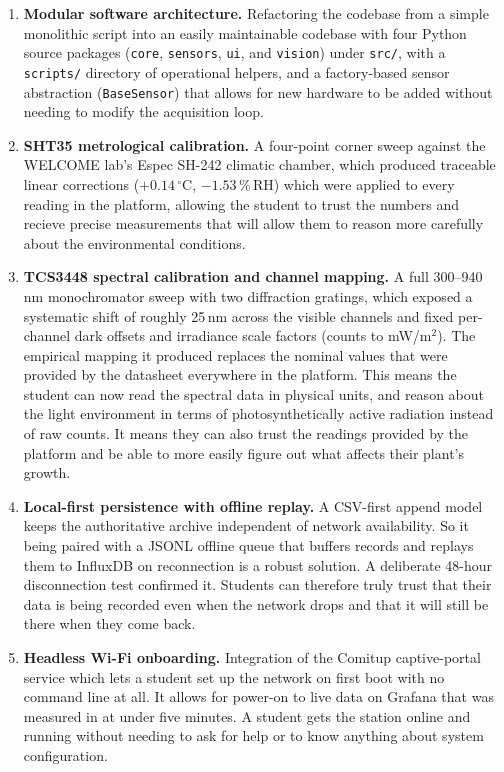 \begin{enumerate}
    \item \textbf{Modular software architecture.} Refactoring the codebase from a simple monolithic script into an easily maintainable codebase with four Python source packages (\texttt{core}, \texttt{sensors}, \texttt{ui}, and \texttt{vision}) under \texttt{src/}, with a \texttt{scripts/} directory of operational helpers, and a factory-based sensor abstraction (\texttt{BaseSensor}) that allows for new hardware to be added without needing to modify the acquisition loop.

    \item \textbf{SHT35 metrological calibration.} A four-point corner sweep against the WELCOME lab's Espec SH-242 climatic chamber, which produced traceable linear corrections ($+0.14\,^\circ$C, $-1.53\,\%$\,RH) which were applied to every reading in the platform, allowing the student to trust the numbers and recieve precise measurements that will allow them to reason more carefully about the environmental conditions.

    \item \textbf{TCS3448 spectral calibration and channel mapping.} A full 300--940\,nm monochromator sweep with two diffraction gratings, which exposed a systematic shift of roughly 25\,nm across the visible channels and fixed per-channel dark offsets and irradiance scale factors (counts to mW/m$^2$). The empirical mapping it produced replaces the nominal values that were provided by the datasheet everywhere in the platform. This means the student can now read the spectral data in physical units, and reason about the light environment in terms of photosynthetically active radiation instead of raw counts. It means they can also trust the readings provided by the platform and be able to more easily figure out what affects their plant's growth.

    \item \textbf{Local-first persistence with offline replay.} A CSV-first append model keeps the authoritative archive independent of network availability. So it being paired with a JSONL offline queue that buffers records and replays them to InfluxDB on reconnection is a robust solution. A deliberate 48-hour disconnection test confirmed it. Students can therefore truly trust that their data is being recorded even when the network drops and that it will still be there when they come back.

    \item \textbf{Headless Wi-Fi onboarding.} Integration of the Comitup captive-portal service which lets a student set up the network on first boot with no command line at all. It allows for power-on to live data on Grafana that was measured in at under five minutes. A student gets the station online and running without needing to ask for help or to know anything about system configuration.


\end{enumerate}
